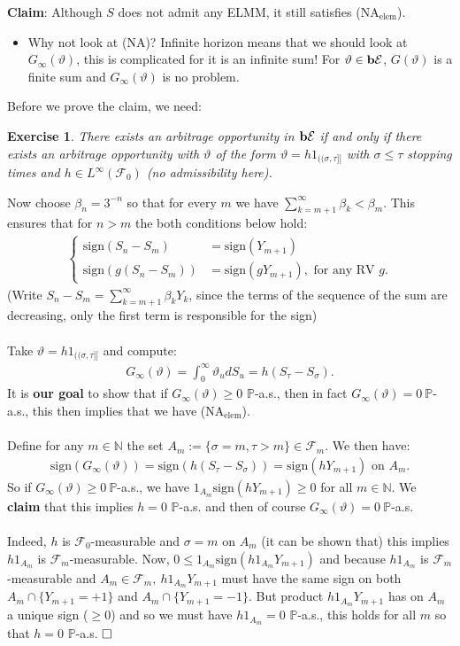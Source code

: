 \documentclass[12pt,a4paper, twoside]{article}
\newtheorem{exe}{Exercise}[section]
\theoremstyle{definition}
\newcommand{\PP}{\mathbb{P}} %
\newcommand{\simple}{\textbf{\text{b}}\mathcal{E}}
\newcommand{\sign}{\text{sign}}
\begin{document}
\textbf{Claim}: Although $S$ does not admit any ELMM, it still satisfies (NA$_\text{elem}$). 
\begin{itemize}
\item Why not look at (NA)? Infinite horizon means that we should look at $G_\infty ( \vartheta)$, this is complicated for it is an infinite sum! For $\vartheta \in \simple$, $G( \vartheta)$ is a finite sum and $G_\infty( \vartheta)$ is no problem. 
\end{itemize}
Before we prove the claim, we need:
\begin{exe} There exists an arbitrage opportunity in $\simple$ if and only if there exists an arbitrage opportunity with $\vartheta$ of the form $\vartheta = h 1_{(\!(\sigma, \tau ]\!]}$ with $\sigma \leq \tau$ stopping times and $h \in L^\infty ( \mathcal{F}_0)$ (no admissibility here). 
\end{exe}
Now choose $\beta_n = 3^{-n}$ so that for every $m$ we have $\sum_{k=m+1}^\infty \beta_k < \beta_m$. This ensures that for $n >m$ the both conditions below hold:
\begin{align*}
\begin{cases} \sign(S_n-S_m)&= \sign(Y_{m+1}) \\
\sign(g(S_n-S_m))&= \sign(gY_{m+1}), \text{ for any RV } g. 
\end{cases}
\end{align*}
(Write $S_n-S_m = \sum_{k=m+1}^\infty \beta_k Y_k$, since the terms of the sequence of the sum are decreasing, only the first term is responsible for the sign)\\
\\
Take $\vartheta = h 1_{(\!( \sigma, \tau ]\!]}$ and compute: 
\begin{align*}
G_\infty ( \vartheta) = \int_0^\infty \vartheta_u d S_u = h ( S_\tau-S_\sigma).  
\end{align*}
It is \textbf{our goal} to show that if $G_\infty( \vartheta) \geq 0$ $\PP$-a.s., then in fact $G_\infty( \vartheta)=0 \ \PP$-a.s., this then implies that we have (NA$_\text{elem}$). \\
\\
Define for any $m \in \mathbb{N}$ the set $A_m:= \{ \sigma = m, \tau > m \} \in \mathcal{F}_m$. We then have: 
\begin{align*}
\sign(G_\infty( \vartheta))= \sign(h(S_\tau-S_\sigma)) = \sign(hY_{m+1}) \text{ on } A_m. 
\end{align*}
So if $G_\infty ( \vartheta) \geq 0 \ \PP$-a.s., we have $1_{A_m} \sign(hY_{m+1}) \geq 0$ for all $m \in \mathbb{N}$. We \textbf{claim} that this implies $h=0$ $\PP$-a.s. and then of course $G_\infty ( \vartheta)=0 \ \PP$-a.s. \\
\\
Indeed, $h$ is $\mathcal{F}_0$-measurable and $\sigma=m$ on $A_m$ (it can be shown that) this implies $h1_{A_m}$ is $\mathcal{F}_m$-measurable. Now, $0 \leq 1_{A_m} \sign(h1_{A_m}Y_{m+1})$ and because $h1_{A_m}$ is $\mathcal{F}_m$-measurable and $A_m \in \mathcal{F}_m, \ h 1_{A_m} Y_{m+1}$ must have the same sign on both $A_m \cap \{Y_{m+1}=+1\}$ and $A_m \cap \{Y_{m+1}=-1\}.$ But product $h1_{A_m} Y_{m+1}$ has on $A_m$ a unique sign ($ \geq 0$) and so we must have $h1_{A_m}=0$ $\PP$-a.s., this holds for all $m$ so that $h=0$ $\PP$-a.s. $\hfill \Box$
\newpage
\end{document}
